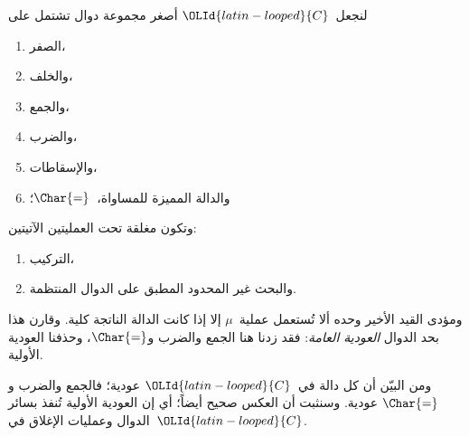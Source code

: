 \documentclass[../../../include/open-logic-section]{subfiles}
\begin{document}

لنجعل~${\OLId{latin-looped}{C}}$ أصغر مجموعة دوال تشتمل على
\begin{enumerate}
\item الصفر،
\item والخلف،
\item والجمع،
\item والضرب،
\item والإسقاطات،
\item والدالة المميزة للمساواة،~$\Char{=}$؛
\end{enumerate}
وتكون مغلقة تحت العمليتين الآتيتين:
\begin{enumerate}
\item التركيب،
\item والبحث غير المحدود المطبق على الدوال المنتظمة.
\end{enumerate}
ومؤدى القيد الأخير وحده ألا تُستعمل عملية~$\mu$ إلا إذا كانت الدالة
الناتجة كلية. وقارن هذا بحد الدوال \emph{العودية العامة}: فقد زدنا هنا
الجمع والضرب و$\Char{=}$، وحذفنا العودية الأولية.

ومن البيّن أن كل دالة في~${\OLId{latin-looped}{C}}$ عودية؛ فالجمع والضرب و$\Char{=}$ عودية.
وسنثبت أن العكس صحيح أيضاً؛ أي إن العودية الأولية تُنفذ بسائر الدوال
وعمليات الإغلاق في~${\OLId{latin-looped}{C}}$.
\end{document}
